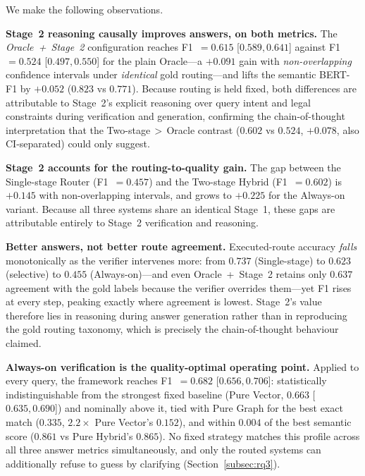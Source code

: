 \documentclass[pdflatex,sn-mathphys-num]{sn-jnl}
\begin{document}
We make the following observations.

\noindent\textbf{Stage~2 reasoning causally improves answers, on both
metrics.} The \textit{Oracle~+~Stage~2} configuration reaches F1~$=0.615$
{\scriptsize[$0.589, 0.641$]} against F1~$=0.524$
{\scriptsize[$0.497, 0.550$]} for the plain Oracle---a $+0.091$ gain with
\emph{non-overlapping} confidence intervals under \emph{identical} gold
routing---and lifts the semantic BERT-F1 by $+0.052$ ($0.823$ vs $0.771$).
Because routing is held fixed, both differences are attributable to
Stage~2's explicit reasoning over query intent and legal constraints during
verification and generation, confirming the chain-of-thought interpretation
that the Two-stage$\,>\,$Oracle contrast ($0.602$ vs $0.524$, $+0.078$, also
CI-separated) could only suggest.

\noindent\textbf{Stage~2 accounts for the routing-to-quality gain.} The gap
between the Single-stage Router (F1~$=0.457$) and the Two-stage Hybrid
(F1~$=0.602$) is $+0.145$ with non-overlapping intervals, and grows to
$+0.225$ for the Always-on variant. Because all three systems share an
identical Stage~1, these gaps are attributable entirely to Stage~2
verification and reasoning.

\noindent\textbf{Better answers, not better route agreement.} Executed-route
accuracy \emph{falls} monotonically as the verifier intervenes more: from
$0.737$ (Single-stage) to $0.623$ (selective) to $0.455$
(Always-on)---and even Oracle~+~Stage~2 retains only $0.637$ agreement with
the gold labels because the verifier overrides them---yet F1 rises at every
step, peaking exactly where agreement is lowest. Stage~2's value therefore
lies in reasoning during answer generation rather than in reproducing the
gold routing taxonomy, which is precisely the chain-of-thought behaviour
claimed.

\noindent\textbf{Always-on verification is the quality-optimal operating
point.} Applied to every query, the framework reaches F1~$=0.682$
{\scriptsize[$0.656, 0.706$]}: statistically indistinguishable from the
strongest fixed baseline (Pure Vector, $0.663$
{\scriptsize[$0.635, 0.690$]}) and nominally above it, tied with Pure Graph
for the best exact match ($0.335$, $2.2\times$ Pure Vector's $0.152$), and
within $0.004$ of the best semantic score ($0.861$ vs Pure Hybrid's
$0.865$). No fixed strategy matches this profile across all three answer
metrics simultaneously, and only the routed systems can additionally refuse
to guess by clarifying (Section~\ref{subsec:rq3}).
\end{document}
